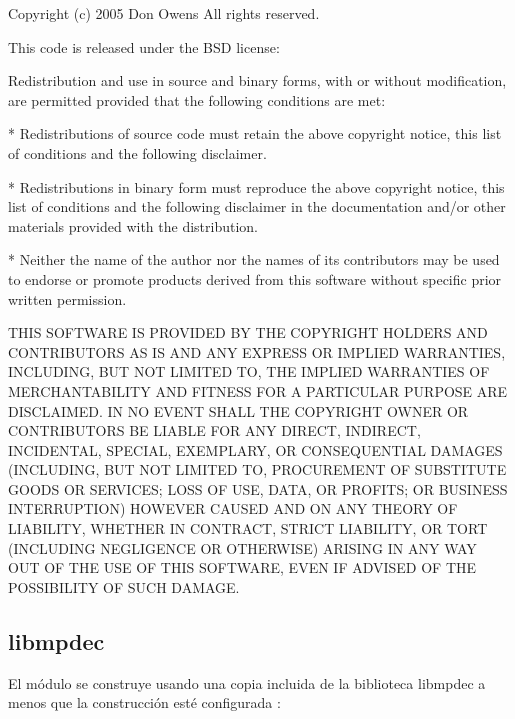 \documentclass[a4,10pt,spanish]{sphinxmanual}
\begin{document}
\begin{sphinxVerbatim}[commandchars=\\\{\}]
Copyright (c) 2005 Don Owens
All rights reserved.

This code is released under the BSD license:

Redistribution and use in source and binary forms, with or without
modification, are permitted provided that the following conditions
are met:

  * Redistributions of source code must retain the above copyright
    notice, this list of conditions and the following disclaimer.

  * Redistributions in binary form must reproduce the above
    copyright notice, this list of conditions and the following
    disclaimer in the documentation and/or other materials provided
    with the distribution.

  * Neither the name of the author nor the names of its
    contributors may be used to endorse or promote products derived
    from this software without specific prior written permission.

THIS SOFTWARE IS PROVIDED BY THE COPYRIGHT HOLDERS AND CONTRIBUTORS
\PYGZdq{}AS IS\PYGZdq{} AND ANY EXPRESS OR IMPLIED WARRANTIES, INCLUDING, BUT NOT
LIMITED TO, THE IMPLIED WARRANTIES OF MERCHANTABILITY AND FITNESS
FOR A PARTICULAR PURPOSE ARE DISCLAIMED. IN NO EVENT SHALL THE
COPYRIGHT OWNER OR CONTRIBUTORS BE LIABLE FOR ANY DIRECT, INDIRECT,
INCIDENTAL, SPECIAL, EXEMPLARY, OR CONSEQUENTIAL DAMAGES
(INCLUDING, BUT NOT LIMITED TO, PROCUREMENT OF SUBSTITUTE GOODS OR
SERVICES; LOSS OF USE, DATA, OR PROFITS; OR BUSINESS INTERRUPTION)
HOWEVER CAUSED AND ON ANY THEORY OF LIABILITY, WHETHER IN CONTRACT,
STRICT LIABILITY, OR TORT (INCLUDING NEGLIGENCE OR OTHERWISE)
ARISING IN ANY WAY OUT OF THE USE OF THIS SOFTWARE, EVEN IF ADVISED
OF THE POSSIBILITY OF SUCH DAMAGE.
\end{sphinxVerbatim}


\subsection{libmpdec}
\label{\detokenize{license:libmpdec}}
\sphinxAtStartPar
El módulo  se construye usando una copia incluida de la biblioteca libmpdec a menos que la construcción esté configurada :
\end{document}
